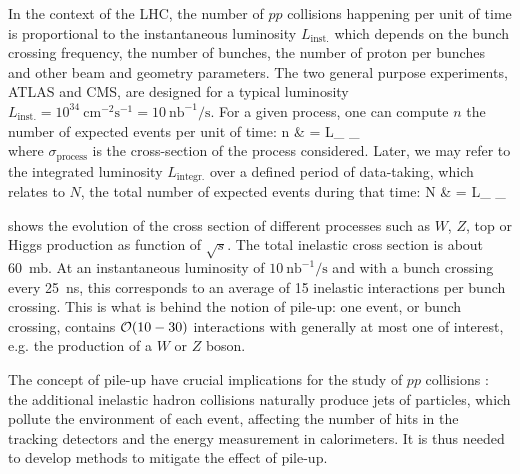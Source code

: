     In the context of the LHC, the number of $pp$ collisions happening per unit of time is
    proportional to the instantaneous luminosity $L_\text{inst.}$ which depends on the bunch crossing
    frequency, the number of bunches, the number of proton per bunches and other beam and
    geometry parameters. The two general purpose experiments, ATLAS and CMS, are designed
    for a typical luminosity $L_\text{inst.} = 10^{34}~\text{cm}^{-2}
    \text{s}^{-1} = 10~\text{nb}^{-1} / \text{s}$. For a given process, one can compute $n$
    the number of expected events per unit of time:
    {
        n & = L_ \times \sigma_ \\
    }
    where $\sigma_\text{process}$ is the cross-section of the process considered. Later, we may refer
    to the integrated luminosity $L_\text{integr.}$ over a defined period of data-taking,
    which relates to $N$, the total number of expected events during that time:
    {
        N & = L_ \times \sigma_
    }

     shows the evolution of the cross section of different
    processes such as $W$, $Z$, top or Higgs production as function of $\sqrt{s}$. The
    total inelastic cross section is about 60~mb. At an instantaneous luminosity of
    $10~\text{nb}^{-1} / \text{s}$ and with a bunch crossing every 25~ns, this corresponds
    to an average of 15 inelastic interactions per bunch crossing. This is what is behind
    the notion of pile-up: one event, or bunch crossing, contains $\mathcal{O}(10-30)$ interactions
    with generally at most one of interest, e.g. the production of a $W$ or $Z$ boson.


    The concept of pile-up have crucial implications for the study of $pp$ collisions : the
    additional inelastic hadron collisions naturally produce jets of particles, which
    pollute the environment of each event, affecting the number of hits in the tracking
    detectors and the energy measurement in calorimeters. It is thus needed to develop
    methods to mitigate the effect of pile-up.

